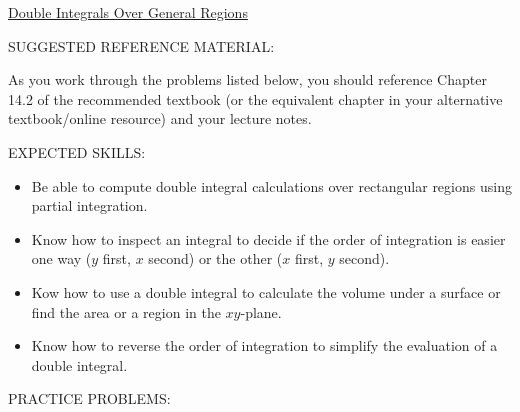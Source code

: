 \documentclass[12pt]{article}
\begin{document}
\begin{center}
\underline{\LARGE{Double Integrals Over General Regions}}
\end{center}

\noindent SUGGESTED REFERENCE MATERIAL:

\bigskip

\noindent As you work through the problems listed below, you should reference Chapter 14.2 of the recommended textbook (or the equivalent chapter in your alternative textbook/online resource) and your lecture notes.

\bigskip

\noindent EXPECTED SKILLS:

\begin{itemize}

\item Be able to compute double integral calculations over rectangular regions using partial integration. 

\item Know how to inspect an integral to decide if the order of integration is easier one way ($y$ first, $x$ second) or the other ($x$ first, $y$ second). 

\item Kow how to use a double integral to calculate the volume under a surface or find the area or a region in the $xy$-plane.

\item Know how to reverse the order of integration to simplify the evaluation of a double integral.

\end{itemize}

\noindent PRACTICE PROBLEMS:

\medskip
\end{document}
